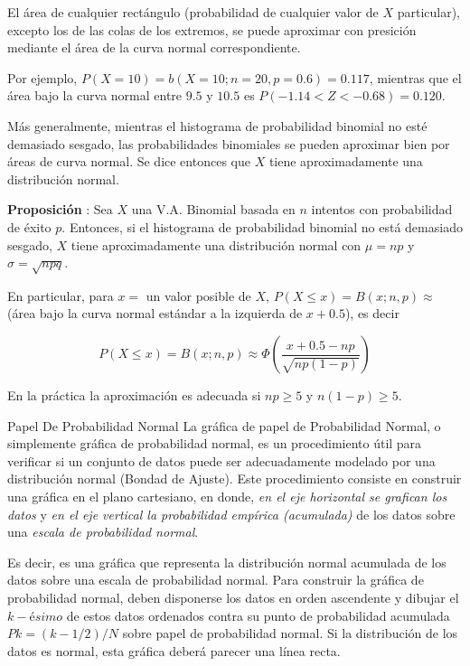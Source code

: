 \documentclass[
  10pt,
  ignorenonframetext,
]{beamer}
\begin{document}
\begin{frame}{}
\protect\hypertarget{section-36}{}
El área de cualquier rectángulo (probabilidad de cualquier valor de
\(X\) particular), excepto los de las colas de los extremos, se puede
aproximar con presición mediante el área de la curva normal
correspondiente.

Por ejemplo, \(P(X = 10) = b(X=10; n =20, p = 0.6) = 0.117\), mientras
que el área bajo la curva normal entre \(9.5\) y \(10.5\) es
\(P(-1.14 < Z < -0.68) = 0.120\).

Más generalmente, mientras el histograma de probabilidad binomial no
esté demasiado sesgado, las probabilidades binomiales se pueden
aproximar bien por áreas de curva normal. Se dice entonces que \(X\)
tiene aproximadamente una distribución normal.
\end{frame}

\begin{frame}{}
\protect\hypertarget{section-37}{}
\textbf{Proposición} : Sea \(X\) una V.A. Binomial basada en \(n\)
intentos con probabilidad de éxito \(p\). Entonces, si el histograma de
probabilidad binomial no está demasiado sesgado, \(X\) tiene
aproximadamente una distribución normal con \(\mu = np\) y
\(\sigma = \sqrt{npq}\).

En particular, para \(x =\) un valor posible de \(X\),
\(P(X \le x) = B(x;n,p) \approx\) (área bajo la curva normal estándar a
la izquierda de \(x + 0.5\)), es decir

\[P(X \le x) = B(x;n,p)  \approx \Phi \left( \frac{x+0.5-np}{\sqrt{np(1-p)}}\right)\]

En la práctica la aproximación es adecuada si \(np \ge 5\) y
\(n(1-p) \ge 5\).
\end{frame}

\begin{frame}{Papel De Probabilidad Normal}
\protect\hypertarget{papel-de-probabilidad-normal}{}
La gráfica de papel de Probabilidad Normal, o simplemente gráfica de
probabilidad normal, es un procedimiento útil para verificar si un
conjunto de datos puede ser adecuadamente modelado por una distribución
normal (Bondad de Ajuste). Este procedimiento consiste en construir una
gráfica en el plano cartesiano, en donde, \emph{en el eje horizontal se
grafican los datos} y \emph{en el eje vertical la probabilidad empírica
(acumulada)} de los datos sobre una \emph{escala de probabilidad
normal}.

Es decir, es una gráfica que representa la distribución normal acumulada
de los datos sobre una escala de probabilidad normal. Para construir la
gráfica de probabilidad normal, deben disponerse los datos en orden
ascendente y dibujar el \(k-ésimo\) de estos datos ordenados contra su
punto de probabilidad acumulada \(Pk = (k - 1/2)/N\) sobre papel de
probabilidad normal. Si la distribución de los datos es normal, esta
gráfica deberá parecer una línea recta.
\end{frame}
\end{document}
